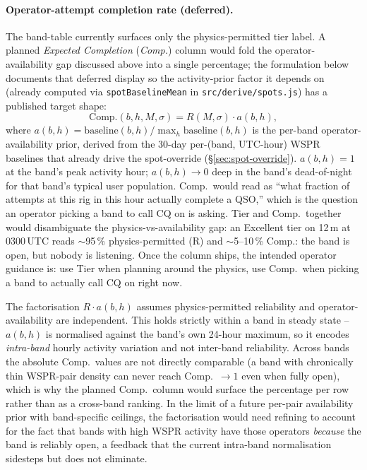 \documentclass[11pt,a4paper]{article}
\begin{document}
\paragraph{Operator-attempt completion rate (deferred).}\label{sec:completion}
The band-table currently surfaces only the physics-permitted tier
label.  A planned \emph{Expected Completion} (\emph{Comp.})
column would fold the operator-availability gap discussed above
into a single percentage; the formulation below documents that
deferred display so the activity-prior factor it depends on
(already computed via \texttt{spotBaselineMean} in
\texttt{src/derive/spots.js}) has a published target shape:
\begin{equation}\label{eq:completion}
  \text{Comp.}(b, h, M, \sigma) =
    R(M, \sigma) \cdot a(b, h),
\end{equation}
where $a(b, h) = \text{baseline}(b, h) / \max_h \text{baseline}(b, h)$
is the per-band operator-availability prior, derived from the
30-day per-(band, UTC-hour) WSPR baselines that already drive the
spot-override (\S\ref{sec:spot-override}). $a(b, h) = 1$ at the
band's peak activity hour; $a(b, h) \to 0$ deep in the band's
dead-of-night for that band's typical user population.  Comp.\
would read as ``what fraction of attempts at this rig in this
hour actually complete a QSO,'' which is the question an operator
picking a band to call CQ on is asking. Tier and Comp.\ together
would disambiguate the physics-vs-availability gap: an Excellent
tier on 12\,m at 0300\,UTC reads $\sim$95\,\% physics-permitted
(R) and $\sim$5--10\,\% Comp.: the band is open, but nobody
is listening. Once the column ships, the intended operator
guidance is: use Tier when planning around the physics, use
Comp.\ when picking a band to actually call CQ on right now.

The factorisation $R \cdot a(b, h)$ assumes physics-permitted
reliability and operator-availability are independent.  This holds
strictly within a band in steady state -- $a(b, h)$ is normalised
against the band's own 24-hour maximum, so it encodes
\emph{intra-band} hourly activity variation and not inter-band
reliability.  Across bands the absolute Comp.\ values are not
directly comparable (a band with chronically thin WSPR-pair density
can never reach Comp.\ $\to 1$ even when fully open), which is why
the planned Comp.\ column would surface the percentage per row
rather than as a cross-band ranking.  In the limit of a future per-pair availability
prior with band-specific ceilings, the factorisation would need
refining to account for the fact that bands with high WSPR activity
have those operators \emph{because} the band is reliably open,
a feedback that the current intra-band normalisation sidesteps but
does not eliminate.
\end{document}
